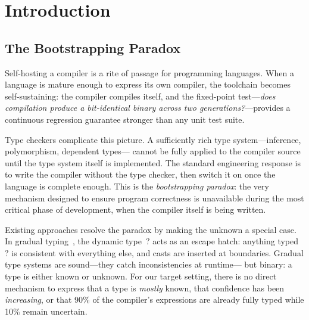 \documentclass[acmsmall,screen,review,anonymous]{acmart}
\begin{document}


\maketitle

\section{Introduction}
\label{sec:intro}

\subsection{The Bootstrapping Paradox}

Self-hosting a compiler is a rite of passage for programming languages.
When a language is mature enough to express its own compiler, the toolchain
becomes self-sustaining: the compiler compiles itself, and the fixed-point
test---\emph{does compilation produce a bit-identical binary across two
generations?}---provides a continuous regression guarantee stronger than
any unit test suite.

Type checkers complicate this picture.
A sufficiently rich type system---inference, polymorphism, dependent types---
cannot be fully applied to the compiler source until the type system itself
is implemented.
The standard engineering response is to write the compiler without the type
checker, then switch it on once the language is complete enough.
This is the \emph{bootstrapping paradox}: the very mechanism designed to
ensure program correctness is unavailable during the most critical phase
of development, when the compiler itself is being written.

Existing approaches resolve the paradox by making the unknown a special
case.
In gradual typing~\cite{siek2006gradual}, the dynamic type~$\mathord{?}$
acts as an escape hatch: anything typed~$?$ is consistent with everything
else, and casts are inserted at boundaries.
Gradual type systems are sound---they catch inconsistencies at runtime---
but binary: a type is either known or unknown.
For our target setting, there is no direct mechanism to express that a type is
\emph{mostly} known,
that confidence has been \emph{increasing}, or that 90\% of the compiler's
expressions are already fully typed while 10\% remain uncertain.
\end{document}
